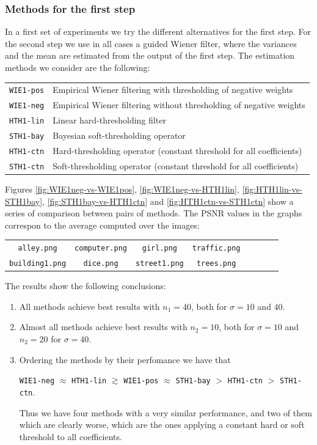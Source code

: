 \documentclass{ipol}
\begin{document}
\subsubsection{Methods for the first step}
In a first set of experiments we try the different alternatives for the first
step. For the second step we use in all cases a guided Wiener filter, where the
variances and the mean are estimated from the output of the first step.
The estimation methods we consider are the following:
\begin{center}
\begin{tabular}{c l}
	\verb+WIE1-pos+ & Empirical Wiener filtering with thresholding of negative weights\\
	\verb+WIE1-neg+ & Empirical Wiener filtering without thresholding of negative weights\\
	\verb+HTH1-lin+ & Linear hard-thresholding filter\\
	\verb+STH1-bay+ & Bayesian soft-thresholding operator\\
	\verb+HTH1-ctn+ & Hard-thresholding operator (constant threshold for all coefficients)\\
	\verb+STH1-ctn+ & Soft-thresholding operator (constant threshold for all coefficients)\\
\end{tabular}
\end{center}

Figures
\ref{fig:WIE1neg-vs-WIE1pos},
\ref{fig:WIE1neg-vs-HTH1lin},
\ref{fig:HTH1lin-vs-STH1bay},
\ref{fig:STH1bay-vs-HTH1ctn} and 
\ref{fig:HTH1ctn-vs-STH1ctn} show a series of comparison between pairs of methods. The PSNR values
in the graphs correspon to the average computed over the images:
\begin{center}
\begin{tabular}{c c c c c c c c}
	\texttt{alley.png} &
	\texttt{computer.png} &
	\texttt{girl.png} &
	\texttt{traffic.png} \\
	\texttt{building1.png} &
	\texttt{dice.png} &
	\texttt{street1.png} &
	\texttt{trees.png} 
\end{tabular}
\end{center}

The results show the following conclusions:
\begin{enumerate}
	\item All methods achieve best results with $n_1 = 40$, both for $\sigma = 10$ and $40$.
	\item Almost all methods achieve best results with $n_2 = 10$, both for
		$\sigma = 10$ and $n_2 = 20$ for $\sigma = 40$.
	\item Ordering the methods by their perfomance we have that
		\begin{center}
			\texttt{WIE1-neg} $\approx$ 
			\texttt{HTH1-lin} $\gtrsim$
			\texttt{WIE1-pos} $\approx$
			\texttt{STH1-bay} $>$
			\texttt{HTH1-ctn} $>$
			\texttt{STH1-ctn}.
		\end{center}
		Thus we have four methods with a very similar performance, and two of
		them which are clearly worse, which are the ones applying a constant hard
		or soft threshold to all coefficients.
\end{enumerate}
\end{document}
